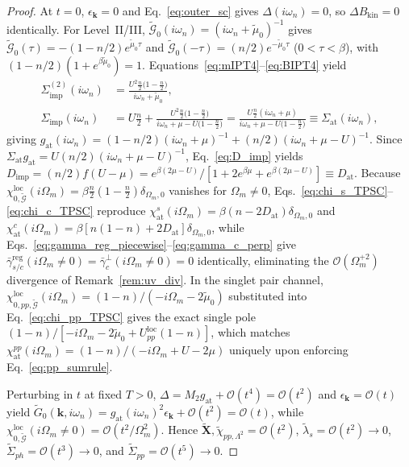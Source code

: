 \documentclass[11pt,a4paper]{article}
\numberwithin{equation}{section}
\theoremstyle{plain}
\theoremstyle{definition}
\providecommand{\vk}{\mathbf{k}}
\begin{document}
\begin{proof}
At $t = 0$, $\epsilon_{\vk} = 0$ and Eq.~\eqref{eq:outer_sc} gives $\Delta(i\omega_n) = 0$,
so $\Delta B_{\mathrm{kin}} = 0$ identically. For Level~II/III,
$\tilde{\mathcal{G}}_0(i\omega_n) = (i\omega_n + \tilde{\mu}_0)^{-1}$ gives
$\tilde{\mathcal{G}}_0(\tau) = -(1-n/2)e^{\tilde{\mu}_0\tau}$ and
$\tilde{\mathcal{G}}_0(-\tau) = (n/2)e^{-\tilde{\mu}_0\tau}$ ($0 < \tau < \beta$), with
$(1-n/2)(1 + e^{\beta\tilde{\mu}_0}) = 1$. Equations~\eqref{eq:mIPT4}--\eqref{eq:BIPT4}
yield
\begin{align}
    \Sigma_{\mathrm{imp}}^{(2)}(i\omega_n)
    &= \frac{U^2 \frac{n}{2}\bigl(1 - \frac{n}{2}\bigr)}{i\omega_n + \tilde{\mu}_0}, \\
    \Sigma_{\mathrm{imp}}(i\omega_n)
    &= U\frac{n}{2} + \frac{U^2 \frac{n}{2}\bigl(1 - \frac{n}{2}\bigr)}
                           {i\omega_n + \mu - U\bigl(1 - \frac{n}{2}\bigr)}
     = \frac{U\frac{n}{2}(i\omega_n + \mu)}{i\omega_n + \mu - U\bigl(1 - \frac{n}{2}\bigr)}
     \equiv \Sigma_{\mathrm{at}}(i\omega_n),
\end{align}
giving $g_{\mathrm{at}}(i\omega_n) = (1-n/2)(i\omega_n+\mu)^{-1} + (n/2)(i\omega_n+\mu-U)^{-1}$.
Since $\Sigma_{\mathrm{at}}g_{\mathrm{at}} = U(n/2)(i\omega_n+\mu-U)^{-1}$,
Eq.~\eqref{eq:D_imp} yields
$D_{\mathrm{imp}} = (n/2)f(U-\mu) = e^{\beta(2\mu-U)}/[1 + 2e^{\beta\mu} + e^{\beta(2\mu-U)}] \equiv D_{\mathrm{at}}$.
Because $\chi_{0,\tilde{\mathcal{G}}}^{\mathrm{loc}}(i\Omega_m) = \beta\frac{n}{2}(1-\frac{n}{2})\delta_{\Omega_m,0}$
vanishes for $\Omega_m \neq 0$, Eqs.~\eqref{eq:chi_s_TPSC}--\eqref{eq:chi_c_TPSC}
reproduce $\chi_{\mathrm{at}}^s(i\Omega_m) = \beta(n - 2D_{\mathrm{at}})\delta_{\Omega_m,0}$
and $\chi_{\mathrm{at}}^c(i\Omega_m) = \beta[n(1-n) + 2D_{\mathrm{at}}]\delta_{\Omega_m,0}$,
while Eqs.~\eqref{eq:gamma_reg_piecewise}--\eqref{eq:gamma_c_perp} give
$\bar{\gamma}_{s/c}^{\mathrm{reg}}(i\Omega_m \neq 0) = \bar{\gamma}_c^\perp(i\Omega_m \neq 0) = 0$
identically, eliminating the $\mathcal{O}(\Omega_m^{+2})$ divergence of Remark~\ref{rem:uv_div}.
In the singlet pair channel,
$\chi_{0,pp,\tilde{\mathcal{G}}}^{\mathrm{loc}}(i\Omega_m) = (1-n)/(-i\Omega_m - 2\tilde{\mu}_0)$
substituted into Eq.~\eqref{eq:chi_pp_TPSC} gives the exact single pole
$(1-n)/[-i\Omega_m - 2\tilde{\mu}_0 + U_{pp}^{\mathrm{loc}}(1-n)]$, which matches
$\chi_{\mathrm{at}}^{pp}(i\Omega_m) = (1-n)/(-i\Omega_m + U - 2\mu)$ uniquely upon
enforcing Eq.~\eqref{eq:pp_sumrule}.

Perturbing in $t$ at fixed $T > 0$, $\Delta = M_2 g_{\mathrm{at}} + \mathcal{O}(t^4) = \mathcal{O}(t^2)$
and $\epsilon_{\vk} = \mathcal{O}(t)$ yield
$\tilde{G}_0(\vk,i\omega_n) = g_{\mathrm{at}}(i\omega_n)^2\epsilon_{\vk} + \mathcal{O}(t^2) = \mathcal{O}(t)$,
while $\chi_{0,\tilde{\mathcal{G}}}^{\mathrm{loc}}(i\Omega_m \neq 0) = \mathcal{O}(t^2/\Omega_m^2)$.
Hence $\tilde{\mathbf{X}}, \tilde{\chi}_{pp,\Lambda^2} = \mathcal{O}(t^2)$,
$\tilde{\lambda}_s = \mathcal{O}(t^2) \to 0$, $\tilde{\Sigma}_{ph} = \mathcal{O}(t^3) \to 0$,
and $\tilde{\Sigma}_{pp} = \mathcal{O}(t^5) \to 0$.


\end{proof}
\end{document}
